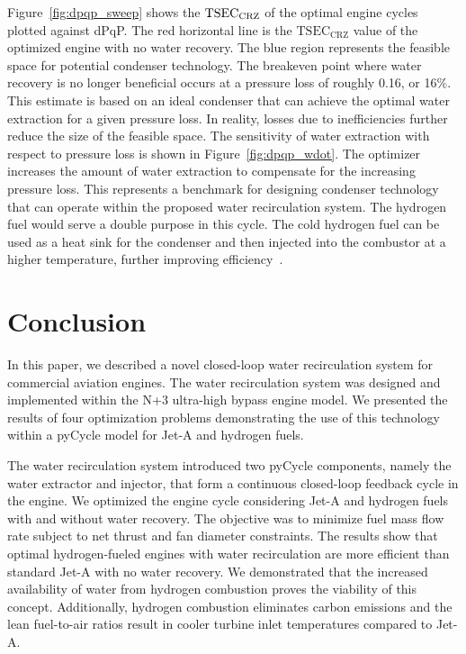 \documentclass[conf]{new-aiaa}
\begin{document}
Figure~\ref{fig:dpqp_sweep} shows the $\rm{TSEC}_{\rm{CRZ}}$ of the optimal engine cycles plotted against dPqP.
The red horizontal line is the $\text{TSEC}_\text{CRZ}$ value of the optimized engine with no water recovery.
The blue region represents the feasible space for potential condenser technology.
The breakeven point where water recovery is no longer beneficial occurs at a pressure loss of roughly 0.16, or 16\%.
This estimate is based on an ideal condenser that can achieve the optimal water extraction for a given pressure loss.
In reality, losses due to inefficiencies further reduce the size of the feasible space.
The sensitivity of water extraction with respect to pressure loss is shown in Figure~\ref{fig:dpqp_wdot}.
The optimizer increases the amount of water extraction to compensate for the increasing pressure loss.
This represents a benchmark for designing condenser technology that can operate within the proposed water recirculation system.
The hydrogen fuel would serve a double purpose in this cycle.
The cold hydrogen fuel can be used as a heat sink for the condenser and then injected into the combustor at a higher temperature, further improving efficiency~\cite{Boggia2002}.

\section{Conclusion}
\label{sec:conc}
In this paper, we described a novel closed-loop water recirculation system for commercial aviation engines.
The water recirculation system was designed and implemented within the N+3 ultra-high bypass engine model.
We presented the results of four optimization problems demonstrating the use of this technology within a pyCycle model for Jet-A and hydrogen fuels.

The water recirculation system introduced two pyCycle components, namely the water extractor and injector, that form a continuous closed-loop feedback cycle in the engine.
We optimized the engine cycle considering Jet-A and hydrogen fuels with and without water recovery.
The objective was to minimize fuel mass flow rate subject to net thrust and fan diameter constraints.
The results show that optimal hydrogen-fueled engines with water recirculation are more efficient than standard Jet-A with no water recovery.
We demonstrated that the increased availability of water from hydrogen combustion proves the viability of this concept.
Additionally, hydrogen combustion eliminates carbon emissions and the lean fuel-to-air ratios result in cooler turbine inlet temperatures compared to Jet-A.
\end{document}
